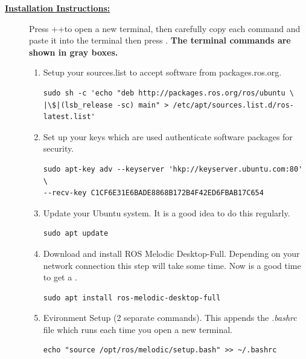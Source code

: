\documentclass[12pt]{article}
\begin{document}
\begin{description}
\item[\textbf{\underline{Installation Instructions:}}] \hfill \vspace{0mm}

Press \CTRLKey+\ALTKey+\TKey to open a new terminal, then carefully copy each command and paste it into the terminal then press \ENTERKey. { \bf The terminal commands are shown in gray boxes.}


\begin{enumerate}
	
	
	\item  Setup your sources.list to accept software from packages.ros.org.

	\begin{verbatim}
sudo sh -c 'echo "deb http://packages.ros.org/ros/ubuntu \
|\$|(lsb_release -sc) main" > /etc/apt/sources.list.d/ros-latest.list'
	\end{verbatim}
	
	\item Set up your keys which are used authenticate software packages for security.
	
	\begin{verbatim}
sudo apt-key adv --keyserver 'hkp://keyserver.ubuntu.com:80' \ 
--recv-key C1CF6E31E6BADE8868B172B4F42ED6FBAB17C654
	\end{verbatim}
				
	\item Update your Ubuntu system. It is a good idea to do this regularly.  
	
	\begin{verbatim}
sudo apt update
	\end{verbatim}

\newpage
	
	\item Download and install ROS Melodic Desktop-Full. Depending on your network connection this step will take some time. Now is a good time to get a \Coffeecup \Cooley.  
	
	\begin{verbatim}
sudo apt install ros-melodic-desktop-full
	\end{verbatim}

\item Evironment Setup (2 separate commands). This appends the {\it .bashrc} file which runs each time you open a new terminal. 
\begin{verbatim} 
echo "source /opt/ros/melodic/setup.bash" >> ~/.bashrc
\end{verbatim}


\end{enumerate}
\end{description}
\end{document}
